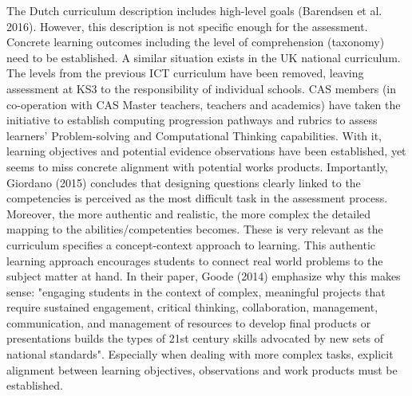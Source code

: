 The Dutch curriculum description includes high-level goals (Barendsen et al. 2016). However, this description is not specific enough for the assessment. Concrete learning outcomes including the level of comprehension (taxonomy) need to be established. A similar situation exists in the UK national curriculum. The levels from the previous ICT curriculum have been removed, leaving assessment at KS3 to the responsibility of individual schools. CAS members (in co-operation with CAS Master teachers, teachers and academics) have taken the initiative to establish computing progression pathways and rubrics to assess learners' Problem-solving and Computational Thinking capabilities. With it, learning objectives and potential evidence observations have been established, yet seems to miss concrete alignment with potential works products. Importantly, Giordano (2015) concludes that designing questions clearly linked to the competencies is perceived as the most difficult task in the assessment process. Moreover, the more authentic and realistic, the more complex the detailed mapping to the abilities/competenties becomes. These is very relevant as the curriculum specifies a concept-context approach to learning. This authentic learning approach encourages students to connect real world problems to the subject matter at hand. In their paper, Goode (2014) emphasize why this makes sense: "engaging students in the context of complex, meaningful projects that require sustained engagement, critical thinking, collaboration, management, communication, and management of resources to develop final products or presentations builds the types of 21st century skills advocated by new sets of national standards". Especially when dealing with more complex tasks, explicit alignment between learning objectives, observations and work products must be established.



%



